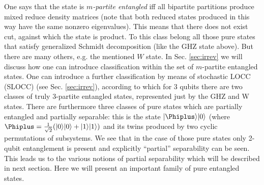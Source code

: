 \documentclass[rmp,12pt,preprint]{revtex4-2}
\begin{document}
One says that the state is {\it $m$-partite
entangled} iff
all bipartite partitions produce mixed reduce density matrices (note
that both reduced states produced in this way have the same nonzero
eigenvalues). This means that there does not exist cut, against
which the state is product. To this class belong all those pure
states that satisfy generalized Schmidt decomposition (like the GHZ
state above). But there are many others, e.g. the mentioned $W$
state. In Sec. \ref{sec:irrev} we will discuss how one can
introduce classification within the set of $m$-partite entangled
states. One can introduce a further classification by means of
stochastic LOCC (SLOCC) (see Sec. \ref{sec:irrev}),
according to which for $3$ qubits there are two classes of truly
$3$-partite entangled states, represented just by the GHZ and W
states. There are furthermore three classes of pure states which are
partially entangled and partially separable: this is the state
$|\Phiplus\rangle|0\rangle$ (where
$\Phiplus=\frac{1}{\sqrt{2}}(|0\rangle|0\rangle +
|1\rangle|1\rangle)$ and its twins produced by two cyclic
permutations of subsystems. We see that in the case of those pure
states only 2-qubit entanglement is present and explicitly
``partial'' separability can be seen. This leads us to the various
notions of partial separability which will be described in next
section. Here we will present an important family of pure entangled
states.
\end{document}
